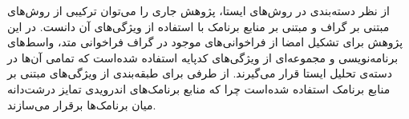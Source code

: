 از نظر دسته‌بندی در روش‌های ایستا، پژوهش جاری را می‌توان ترکیبی از روش‌های مبتنی بر گراف و مبتنی بر منابع برنامک با استفاده از ویژگی‌های آن‌ دانست. در این پژوهش برای تشکیل امضا از فراخوانی‌های موجود در گراف فراخوانی متد‌، واسط‌های برنامه‌نویسی و مجموعه‌ای از ویژگی‌های کد‌پایه استفاده شده‌است که تمامی آن‌ها در دسته‌ی تحلیل ایستا قرار می‌گیرند. از طرفی برای طبقه‌بندی از ویژگی‌های مبتنی بر منابع برنامک استفاده ‌شده‌است چرا که منابع برنامک‌های اندرویدی تمایز درشت‌دانه میان برنامک‌ها برقرار می‌سازند.















